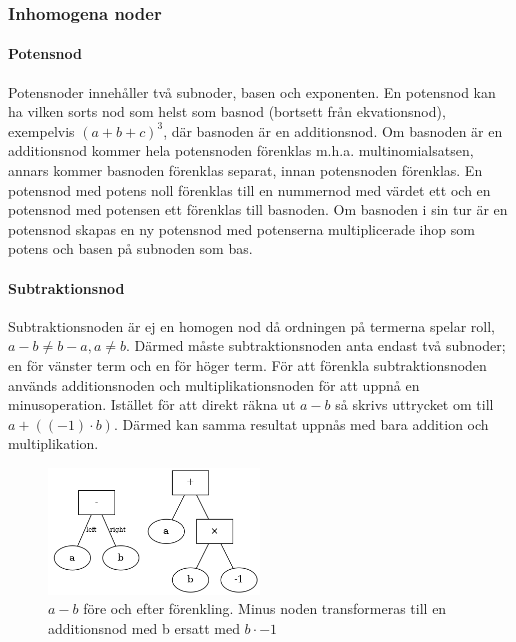 \documentclass[12pt,a4paper]{article}
\begin{document}
\subsubsection{Inhomogena noder}
\paragraph{Potensnod}
\label{subsubsec:potensnod}
Potensnoder innehåller två subnoder, basen och exponenten. En potensnod kan ha vilken sorts nod som helst som basnod (bortsett från ekvationsnod), exempelvis \((a+b+c)^{3}\), där basnoden är en additionsnod. Om basnoden är en additionsnod kommer hela potensnoden förenklas m.h.a. multinomialsatsen, annars kommer basnoden förenklas separat, innan potensnoden förenklas. En potensnod med potens noll förenklas till en nummernod med värdet ett och en potensnod med potensen ett förenklas till basnoden. Om basnoden i sin tur är en potensnod skapas en ny potensnod med potenserna multiplicerade ihop som potens och basen på subnoden som bas.
\paragraph{Subtraktionsnod}
Subtraktionsnoden är ej en homogen nod då ordningen på termerna spelar roll, \(a-b\neq b-a, a \neq b\). Därmed måste subtraktionsnoden anta endast två subnoder; en för vänster term och en för höger term. För att förenkla subtraktionsnoden används additionsnoden och multiplikationsnoden för att uppnå en minusoperation. Istället för att direkt räkna ut \(a-b\) så skrivs uttrycket om till \(a+((-1)\cdot b)\). Därmed kan samma resultat uppnås med bara addition och multiplikation.
\begin{figure}[h!]
  \centering
  \includegraphics[width=0.5\textwidth]{image-merged3.png}
  \caption{\(a-b\) före och efter förenkling. Minus noden transformeras till en additionsnod med b ersatt med \(b \cdot -1\)}
\end{figure}
\end{document}
